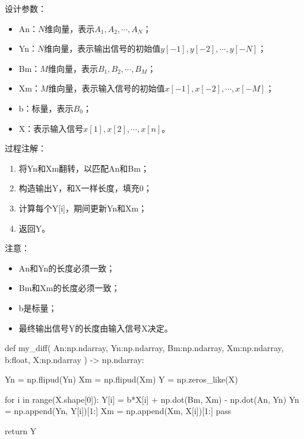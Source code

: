 设计参数：
\begin{itemize}
    \item An：$N$维向量，表示$A_1,A_2,\cdots ,A_N$；
    \item Yn：$N$维向量，表示输出信号的初始值$y\left[ -1 \right] ,y\left[ -2 \right] ,\cdots ,y\left[ -N \right] $；
    \item Bm：$M$维向量，表示$B_1,B_2,\cdots ,B_M$；
    \item Xm：$M$维向量，表示输入信号的初始值$x\left[ -1 \right] ,x\left[ -2 \right] ,\cdots ,x\left[ -M \right] $；
    \item b：标量，表示$B_0$；
    \item X：表示输入信号$x\left[ 1 \right] ,x\left[ 2 \right] ,\cdots ,x\left[ n \right] $。
\end{itemize}

过程注解：
\begin{enumerate}
    \item 将Yn和Xm翻转，以匹配An和Bm；
    \item 构造输出Y，和X一样长度，填充0；
    \item 计算每个Y[i]，期间更新Yn和Xm；
    \item 返回Y。
\end{enumerate}

注意：
\begin{itemize}
    \item An和Yn的长度必须一致；
    \item Bm和Xm的长度必须一致；
    \item b是标量；
    \item 最终输出信号Y的长度由输入信号X决定。
\end{itemize}

\begin{python}
def my_diff(
        An:np.ndarray, Yn:np.ndarray,
        Bm:np.ndarray, Xm:np.ndarray,
        b:float,
        X:np.ndarray
        ) -> np.ndarray:

    Yn = np.flipud(Yn)
    Xm = np.flipud(Xm)
    Y  = np.zeros_like(X)

    for i in range(X.shape[0]):
        Y[i] = b*X[i] + np.dot(Bm, Xm) - np.dot(An, Yn)
        Yn = np.append(Yn, Y[i])[1:]
        Xm = np.append(Xm, X[i])[1:]
        pass

    return Y
\end{python}




